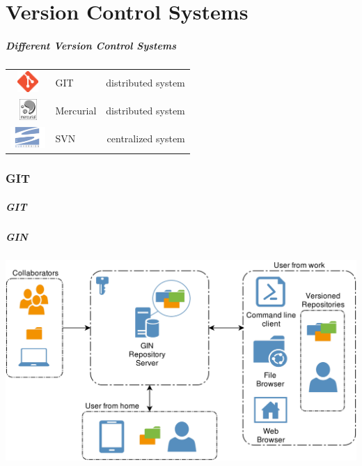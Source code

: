 \documentclass[
t, %
10pt, %
aspectratio=1610, %
ngerman,
english,
]{beamer}
\begin{document}
\part{Version Control Systems}
\makepart

\begin{frame}
    \frametitle{Different Version Control Systems}
    \centering
    \vfill
    \begin{tabular}{ c l r }
        \includegraphics[height=0.8cm]{graphics/giticon_orange.eps} & \large{GIT} &  distributed system\\
        \includegraphics[height=0.8cm]{graphics/Mercurial_logo.png} & \large{Mercurial} &  distributed system\\
        \includegraphics[height=0.8cm]{graphics/Subversion_Logo.png} & \large{SVN} &  centralized system\\
    \end{tabular}
    \vfill

\end{frame}

\section{GIT}
\begin{frame}
	\frametitle{GIT}
\end{frame}


\begin{frame}
    \frametitle{GIN}
    \centering
    \includegraphics[height=0.7\textheight]{graphics/image9539.png}\\
\end{frame}
\end{document}
